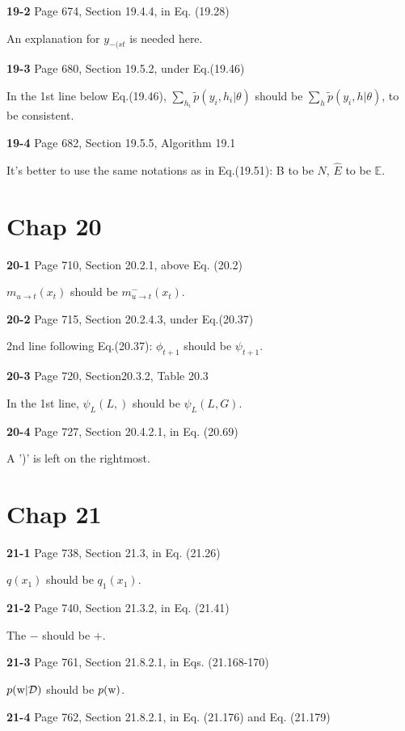 \documentclass[aps,preprint,a4]{revtex4-1}
\begin{document}
{\color{red}\textbf{19-2}} Page 674, Section 19.4.4, in Eq. (19.28)

An explanation for $y_{-(st}$ is needed here.

{\color{red}\textbf{19-3}} Page 680, Section 19.5.2, under Eq.(19.46)

In the 1st line below  Eq.(19.46), $\sum_{h_{i}}\tilde p(y_{i},h_{i}|\theta)$ should be
$\sum_{h}\tilde p(y_{i},h|\theta)$, to be consistent.

{\color{red}\textbf{19-4}} Page 682, Section 19.5.5, Algorithm 19.1

It's better to use the same notations as in Eq.(19.51): B to be $N$, $\hat E$ to be $\mathbb E$.

\section{Chap 20}
{\color{red}\textbf{20-1}} Page 710, Section 20.2.1, above Eq. (20.2)

$m_{u\rightarrow t}(x_{t})$ should be $m^{-}_{u\rightarrow t}(x_{t})$.

{\color{red}\textbf{20-2}} Page 715, Section 20.2.4.3, under Eq.(20.37)

2nd line following Eq.(20.37): $\phi_{t+1}$ should be $\psi_{t+1}$.

{\color{red}\textbf{20-3}} Page 720,  Section20.3.2, Table 20.3

In the 1st line, $\psi_{L}(L,)$ should be $\psi_{L}(L,G)$.

{\color{red}\textbf{20-4}} Page 727, Section 20.4.2.1, in Eq. (20.69)

A ')' is left on the rightmost.




\section{Chap 21}
{\color{red}\textbf{21-1}} Page 738, Section 21.3, in Eq. (21.26) 

$q(x_{1})$ should be $q_{1}(x_{1})$.

{\color{red}\textbf{21-2}} Page 740, Section 21.3.2, in Eq. (21.41)

The $-$ should be $+$.

{\color{red}\textbf{21-3}} Page 761, Section 21.8.2.1, in Eqs. (21.168-170)

$p(\rm w|\mathcal D)$ should be $p(\rm w)$.

{\color{red}\textbf{21-4}} Page 762, Section 21.8.2.1, in Eq. (21.176) and Eq. (21.179)
\end{document}
